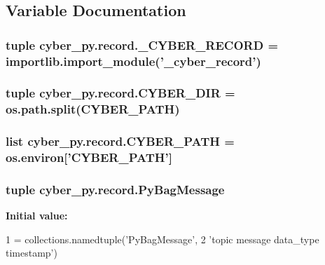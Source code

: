 \subsection{Variable Documentation}
\hypertarget{namespacecyber__py_1_1record_ac65574da5ad067a81b20c676bfa06920}{
\subsubsection[{\-\_\-\-C\-Y\-B\-E\-R\-\_\-\-R\-E\-C\-O\-R\-D}]{\setlength{\rightskip}{0pt plus 5cm}tuple cyber\-\_\-py.\-record.\-\_\-\-C\-Y\-B\-E\-R\-\_\-\-R\-E\-C\-O\-R\-D = importlib.\-import\-\_\-module('\-\_\-cyber\-\_\-record')}}\label{namespacecyber__py_1_1record_ac65574da5ad067a81b20c676bfa06920}
\hypertarget{namespacecyber__py_1_1record_a4323c7b4cd51c5ede88eb2e0be39777c}{
\subsubsection[{C\-Y\-B\-E\-R\-\_\-\-D\-I\-R}]{\setlength{\rightskip}{0pt plus 5cm}tuple cyber\-\_\-py.\-record.\-C\-Y\-B\-E\-R\-\_\-\-D\-I\-R = os.\-path.\-split({\bf C\-Y\-B\-E\-R\-\_\-\-P\-A\-T\-H})}}\label{namespacecyber__py_1_1record_a4323c7b4cd51c5ede88eb2e0be39777c}
\hypertarget{namespacecyber__py_1_1record_a6c55a0934d295d6dcc470358cd211d0e}{
\subsubsection[{C\-Y\-B\-E\-R\-\_\-\-P\-A\-T\-H}]{\setlength{\rightskip}{0pt plus 5cm}list cyber\-\_\-py.\-record.\-C\-Y\-B\-E\-R\-\_\-\-P\-A\-T\-H = os.\-environ\mbox{[}'C\-Y\-B\-E\-R\-\_\-\-P\-A\-T\-H'\mbox{]}}}\label{namespacecyber__py_1_1record_a6c55a0934d295d6dcc470358cd211d0e}
\hypertarget{namespacecyber__py_1_1record_a98b1a8de6dbf0dd9149a7c83db60d880}{
\subsubsection[{Py\-Bag\-Message}]{\setlength{\rightskip}{0pt plus 5cm}tuple cyber\-\_\-py.\-record.\-Py\-Bag\-Message}}\label{namespacecyber__py_1_1record_a98b1a8de6dbf0dd9149a7c83db60d880}
{\bfseries Initial value\-:}
\begin{DoxyCode}
1 = collections.namedtuple(\textcolor{stringliteral}{'PyBagMessage'},
2                                       \textcolor{stringliteral}{'topic message data\_type timestamp'})
\end{DoxyCode}
